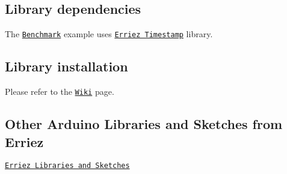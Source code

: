 \subsection*{Library dependencies}


\begin{DoxyItemize}
\item The \href{https://github.com/Erriez/ErriezTM1637/blob/master/examples/Benchmark/Benchmark.ino}{\tt Benchmark} example uses \href{https://github.com/Erriez/ErriezTimestamp}{\tt Erriez Timestamp} library.
\end{DoxyItemize}

\subsection*{Library installation}

Please refer to the \href{https://github.com/Erriez/ErriezArduinoLibrariesAndSketches/wiki}{\tt Wiki} page.

\subsection*{Other Arduino Libraries and Sketches from Erriez}


\begin{DoxyItemize}
\item \href{https://github.com/Erriez/ErriezArduinoLibrariesAndSketches}{\tt Erriez Libraries and Sketches} 
\end{DoxyItemize}